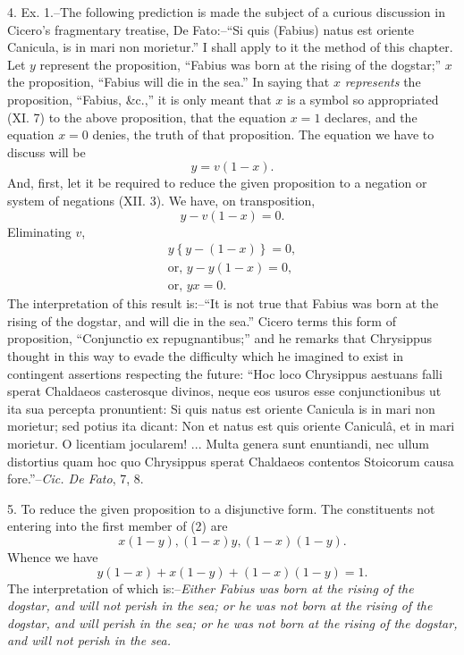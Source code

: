 \documentclass[oneside]{book}
\begin{document}
4. Ex. 1.--The following prediction is made the subject of a
curious discussion in Cicero's fragmentary treatise, De Fato:--``Si
quis (Fabius) natus est oriente Canicula, is in mari non morietur.''
I shall apply to it the method of this chapter. Let $y$
represent the proposition, ``Fabius was born at the rising of the
dogstar;'' $x$ the proposition, ``Fabius will die in the sea.''
In saying that $x$ \textit{represents} the proposition, ``Fabius, \&c.,'' it is
only meant that $x$ is a symbol so appropriated (XI. 7) to the
above proposition, that the equation $x = 1$ declares, and the equation
$x = 0$ denies, the truth of that proposition. The equation
we have to discuss will be
\begin{equation}
     y = v(1-x).
\end{equation}
And, first, let it be required to reduce the given proposition to a
negation or system of negations (XII. 3). We have, on transposition,
\[
     y-v(1-x) = 0.
\]
Eliminating $v$,
\begin{eqnarray}
y\left\{y-(1-x)\right\} = 0, \nonumber \\
\textrm{or, }y-y(1-x) = 0,\nonumber \\
\textrm{or, }yx = 0.
\end{eqnarray}
The interpretation of this result is:--``It is not true that Fabius
was born at the rising of the dogstar, and will die in the sea.''
Cicero terms this form of proposition, ``Conjunctio ex repugnantibus;''
and he remarks that Chrysippus thought in this way
to evade the difficulty which he imagined to exist in contingent
assertions respecting the future: ``Hoc loco Chrysippus aestuans
falli sperat Chaldaeos casterosque divinos, neque eos usuros esse
conjunctionibus ut ita sua percepta pronuntient: Si quis natus
est oriente Canicula is in mari non morietur; sed potius ita dicant:
Non et natus est quis oriente Canicul\^{a}, et in mari morietur.
O licentiam jocularem! ... Multa genera sunt enuntiandi, nec
ullum distortius quam hoc quo Chrysippus sperat Chaldaeos contentos
Stoicorum causa fore.''--\textit{Cic. De Fato}, 7, 8.

5. To reduce the given proposition to a disjunctive form.
The constituents not entering into the first member of (2) are
\[
x(1-y), (1-x)y, (1-x)(1-y).
\]
Whence we have
\begin{equation}
y(1-x) + x(1-y) + (1-x)(1-y) = 1.
\end{equation}
The interpretation of which is:--\textit{Either Fabius was born at the
rising of the dogstar, and will not perish in the sea; or he was not
born at the rising of the dogstar, and will perish in the sea; or he
was not born at the rising of the dogstar, and will not perish in
the sea.}
\end{document}
